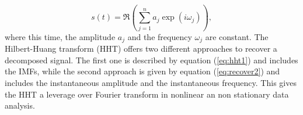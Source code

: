 \documentclass[../Main/thesis.tex]{subfiles}
\begin{document}
\begin{equation}\label{eq:recoverFourier}
s(t) = \Re{\left( \sum_{j=1}^{n}a_{j}\exp\left(i\omega_{j}\right)  \right)},
\end{equation} 
where this time, the amplitude $a_{j}$ and the frequency $\omega_{j}$ are constant. The Hilbert-Huang transform (HHT) offers two different approaches to recover a decomposed signal. The first one is described by equation (\ref{eq:hht1}) and includes the IMFs, while the second approach is given by equation (\ref{eq:recover2}) and includes the instantaneous amplitude and the instantaneous frequency. This gives the HHT a leverage over Fourier transform in nonlinear an non stationary data analysis.
\end{document}
